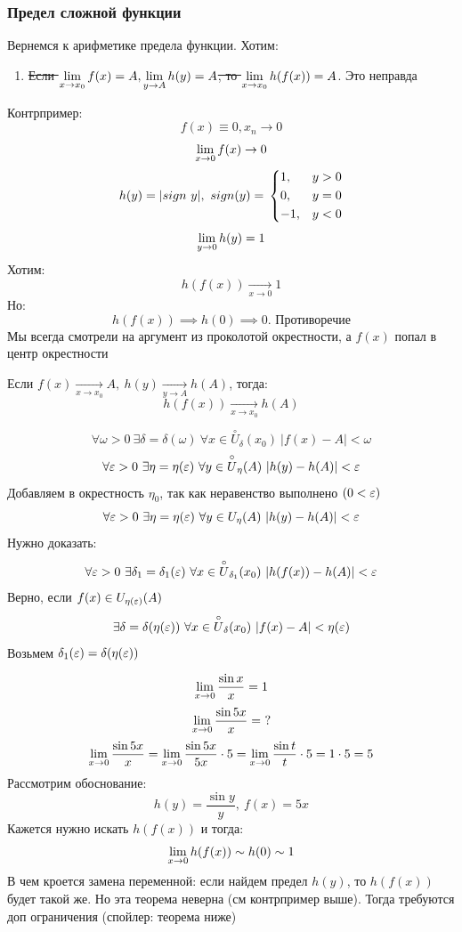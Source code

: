 \subsubsection{Предел сложной функции}
Вернемся к арифметике предела функции. Хотим:

\begin{enumerate}
    \item[5.] \sout{Если $\lim\limits_{x \to x_0} f(x) = A, \lim\limits_{y \to A} h(y) = A$, то $\lim\limits_{x \to x_0} h(f(x)) = A$}. Это неправда
\end{enumerate}

Контрпример:
\[
    f(x) \equiv 0, x_n \to 0
\]
\[
    \lim\limits_{x \to 0} f(x) \to 0
\]
\[
    h(y) = |sign\ y|,\ sign(y) = \\
    \begin{dcases}
        1, &y > 0\\
        0, &y = 0\\
        -1, &y < 0
    \end{dcases}
\]
\[
    \lim\limits_{y \to 0} h(y) = 1
\]
Хотим: 
\[
    h(f(x)) \xrightarrow[x \to 0]{} 1
\]
Но: 
\[
    h(f(x)) \implies h(0) \implies 0 \text{. Противоречие}
\]
Мы всегда смотрели на аргумент из проколотой окрестности, а $f(x)$ попал в центр окрестности

\begin{theorem}
    Если $f(x) \xrightarrow[x \to x_0]{} A,\ h(y) \xrightarrow[y \to A]{} h(A)$, тогда: 
    \[
        h(f(x)) \xrightarrow[x \to x_0]{} h(A)
    \]
\end{theorem}
\begin{Proof}
\[
    \forall \omega > 0\ \exists \delta = \delta (\omega )\ \forall x \in \overset{\circ}{U}_{\delta }(x_0)\ |f(x) - A| < \omega
\]
\[
    \forall \varepsilon > 0\ \exists \eta = \eta (\varepsilon )\ \forall y \in \overset{\circ}{U}_{\eta }(A)\ |h(y) - h(A)| < \varepsilon 
\]
Добавляем в окрестность $\eta_0$, так как неравенство выполнено $(0 < \varepsilon )$
\[
    \forall \varepsilon > 0\ \exists \eta = \eta (\varepsilon )\ \forall y \in {U}_{\eta }(A)\ |h(y) - h(A)| < \varepsilon 
\]
Нужно доказать: 
\[
    \forall \varepsilon > 0\ \exists \delta_1 = \delta_1(\varepsilon )\ \forall x \in \overset{\circ}{U}_{\delta_1}(x_0)\ |h(f(x)) - h(A)| < \varepsilon 
\]
Верно, если $f(x) \in U_{\eta (\varepsilon )}(A)$
\[
    \exists \delta = \delta (\eta (\varepsilon ))\ \forall x \in \overset{\circ}{U}_{\delta }(x_0)\ |f(x) - A| < \eta (\varepsilon )
\]
Возьмем $\delta_1(\varepsilon ) = \delta (\eta (\varepsilon ))$
\end{Proof}

\begin{example}
    \[
        \lim\limits_{x \to 0} \frac{\sin x}{x} = 1
    \]
    \[
        \lim\limits_{x \to 0} \frac{\sin 5x}{x} =\ ?
    \]
    \[
        \lim\limits_{x \to 0} \frac{\sin 5x}{x} = \lim\limits_{x \to 0} \frac{\sin 5x}{5x} \cdot 5 = \lim\limits_{x \to 0} \frac{\sin t}{t} \cdot 5 = 1 \cdot 5 = 5
    \]
    Рассмотрим обоснование: 
    \[
        h(y) = \frac{\sin y}{y},\ f(x) = 5x
    \]
    Кажется нужно искать $h(f(x))$ и тогда: 
    \[
        \lim\limits_{x \to 0} h(f(x)) \sim h(0) \sim 1
    \]
    В чем кроется замена переменной: если найдем предел $h(y)$, то $h(f(x))$ будет такой же. Но эта теорема неверна (см контрпример выше). Тогда требуются доп ограничения (спойлер: теорема ниже)
\end{example}

